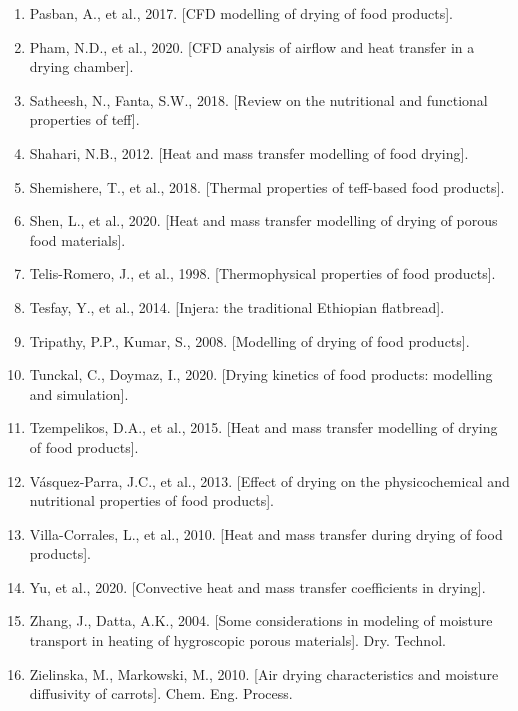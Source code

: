 \documentclass[11pt,a4paper]{ctexart}
\begin{document}
\begin{enumerate}
\item Pasban, A., et al., 2017. [CFD modelling of drying of food products].
\item Pham, N.D., et al., 2020. [CFD analysis of airflow and heat transfer in a drying chamber].
\item Satheesh, N., Fanta, S.W., 2018. [Review on the nutritional and functional properties of teff].
\item Shahari, N.B., 2012. [Heat and mass transfer modelling of food drying].
\item Shemishere, T., et al., 2018. [Thermal properties of teff-based food products].
\item Shen, L., et al., 2020. [Heat and mass transfer modelling of drying of porous food materials].
\item Telis-Romero, J., et al., 1998. [Thermophysical properties of food products].
\item Tesfay, Y., et al., 2014. [Injera: the traditional Ethiopian flatbread].
\item Tripathy, P.P., Kumar, S., 2008. [Modelling of drying of food products].
\item Tunckal, C., Doymaz, I., 2020. [Drying kinetics of food products: modelling and simulation].
\item Tzempelikos, D.A., et al., 2015. [Heat and mass transfer modelling of drying of food products].
\item Vásquez-Parra, J.C., et al., 2013. [Effect of drying on the physicochemical and nutritional properties of food products].
\item Villa-Corrales, L., et al., 2010. [Heat and mass transfer during drying of food products].
\item Yu, et al., 2020. [Convective heat and mass transfer coefficients in drying].
\item Zhang, J., Datta, A.K., 2004. [Some considerations in modeling of moisture transport in heating of hygroscopic porous materials]. Dry. Technol.
\item Zielinska, M., Markowski, M., 2010. [Air drying characteristics and moisture diffusivity of carrots]. Chem. Eng. Process.
\end{enumerate}
\end{document}
